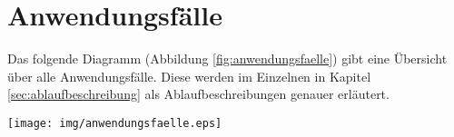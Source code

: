 \section{Anwendungsfälle}
\label{sec:anwendungsfaelle}

Das folgende Diagramm (Abbildung \ref{fig:anwendungsfaelle}) gibt eine Übersicht
über alle Anwendungsfälle. Diese werden im Einzelnen in Kapitel
\ref{sec:ablaufbeschreibung} als Ablaufbeschreibungen genauer erläutert.
\\[\intextsep]
\begin{minipage}{\linewidth}
\centering%
\texttt{[image: img/anwendungsfaelle.eps]}%
%
\label{fig:anwendungsfaelle}%
\end{minipage}

